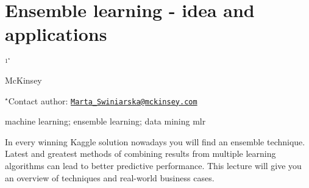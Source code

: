 \documentclass[\main/boa.tex]{subfiles}
\begin{document}
\section{Ensemble learning - idea and applications}

\begin{center}
  {\bf {}$^{1^\star}$}
\end{center}

\vskip 0.3cm

\begin{affiliations}
\begin{enumerate}
\begin{minipage}{0.915\textwidth}
\centering
\item McKinsey \\[-2pt]
\end{minipage}
\end{enumerate}
$^\star$Contact author: \href{mailto:Marta_Swiniarska@mckinsey.com}{\nolinkurl{Marta\_Swiniarska@mckinsey.com}}\\
\end{affiliations}

\vskip 0.5cm

\begin{minipage}{0.915\textwidth}
\keywords machine learning; ensemble learning; data mining
\packages mlr
\end{minipage}

\vskip 0.8cm

In every winning Kaggle solution nowadays you will find an ensemble
technique. Latest and greatest methods of combining results from
multiple learning algorithms can lead to better predictive performance.
This lecture will give you an overview of techniques and real-world
business cases.
\end{document}
